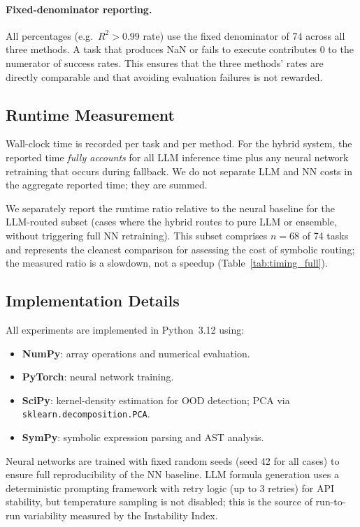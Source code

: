 \documentclass[twoside,11pt]{article}
\newcommand{\Rsq}{R^{2}}
\begin{document}
\paragraph{Fixed-denominator reporting.}
All percentages (e.g.\ $\Rsq > 0.99$ rate) use the fixed denominator of 74 across
all three methods.  A task that produces NaN or fails to execute contributes 0 to
the numerator of success rates.  This ensures that the three methods' rates are
directly comparable and that avoiding evaluation failures is not rewarded.

\subsection{Runtime Measurement}\label{subsec:runtime-measurement}
\label{sec:timing_setup}

Wall-clock time is recorded per task and per method.  For the hybrid system,
the reported time \emph{fully accounts} for all LLM inference time plus any
neural network retraining that occurs during fallback.  We do not separate
LLM and NN costs in the aggregate reported time; they are summed.

We separately report the runtime ratio relative to the neural baseline for the
LLM-routed subset (cases where the hybrid routes to pure LLM or ensemble,
without triggering full NN retraining). This subset comprises $n=68$ of 74 tasks
and represents the cleanest comparison for assessing the cost of symbolic
routing; the measured ratio is a slowdown, not a speedup (Table~\ref{tab:timing_full}).

\subsection{Implementation Details}\label{subsec:implementation-details}
\label{sec:setup_impl}

All experiments are implemented in Python~3.12 using:
\begin{itemize}
  \item \textbf{NumPy}: array operations and numerical evaluation.
  \item \textbf{PyTorch}: neural network training.
  \item \textbf{SciPy}: kernel-density estimation for OOD detection; PCA via
    \texttt{sklearn.decomposition.PCA}.
  \item \textbf{SymPy}: symbolic expression parsing and AST analysis.
\end{itemize}

Neural networks are trained with fixed random seeds (seed 42 for all cases) to
ensure full reproducibility of the NN baseline.  LLM formula generation uses a
deterministic prompting framework with retry logic (up to 3 retries) for API
stability, but temperature sampling is not disabled; this is the source of
run-to-run variability measured by the Instability Index.
\end{document}
